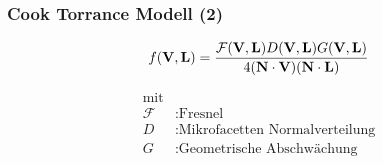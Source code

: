 \begin{frame}
  \frametitle{Cook Torrance Modell (2)}
  \begin{Definition}

    \begin{align*}
    	f(\mathbf V,\mathbf L) = \frac{\mathcal{F}(\mathbf V,\mathbf L)D(\mathbf V,\mathbf L)G(\mathbf V,\mathbf L)}{4(\mathbf N \cdot \mathbf V)(\mathbf N \cdot \mathbf L)}
    \end{align*}

    \begin{align*}
      \text{mit}\\
      \mathcal{F} &: \text{Fresnel} \\
    	D  &: \text{Mikrofacetten Normalverteilung} \\
    	G  &: \text{Geometrische Abschwächung}
    \end{align*}

  \end{Definition}
\end{frame}



